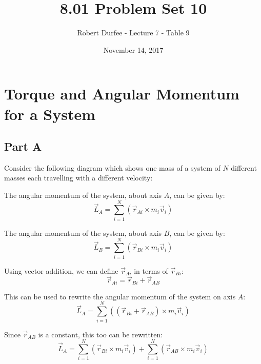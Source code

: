 \documentclass{article}
\title{ 8.01 Problem Set 10 }
\author{ Robert Durfee - Lecture 7 - Table 9}
\date{ November 14, 2017 }
\begin{document}
\maketitle

\section{ Torque and Angular Momentum for a System }

\subsection*{Part A}

Consider the following diagram which shows one mass of a system of $N$ different
masses each travelling with a different velocity:

\begin{figure}[H]
    \centering
\end{figure}

The angular momentum of the system, about axis $A$, can be given by:
$$\vec{L}_A = \sum \limits_{i=1}^{N} \left( \vec{r}_{Ai} \times m_i \vec{v}_i
\right)$$

The angular momentum of the system, about axis $B$, can be given by:
$$\vec{L}_B = \sum \limits_{i=1}^{N} \left( \vec{r}_{Bi} \times m_i \vec{v}_i
\right)$$

Using vector addition, we can define $\vec{r}_{Ai}$ in terms of $\vec{r}_{Bi}$:
$$\vec{r}_{Ai} = \vec{r}_{Bi} + \vec{r}_{AB}$$

This can be used to rewrite the angular momentum of the system on axis $A$:
$$\vec{L}_A = \sum \limits_{i=1}^{N} \left( \left( \vec{r}_{Bi} + \vec{r}_{AB}
\right) \times m_i \vec{v}_i \right)$$

Since $\vec{r}_{AB}$ is a constant, this too can be rewritten:
$$\vec{L}_A = \sum \limits_{i=1}^{N} \left( \vec{r}_{Bi} \times m_i \vec{v}_i
\right) + \sum \limits_{i=1}^{N} \left( \vec{r}_{AB} \times m_i \vec{v}_i
\right)$$
\end{document}
